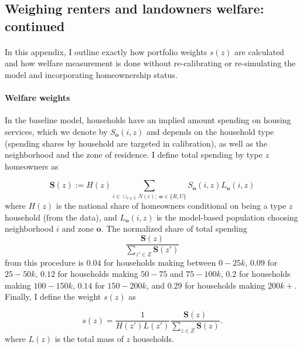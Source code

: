 \documentclass[12pt]{article}
\begin{document}
	
	\clearpage
	\subsection{Weighing renters and landowners welfare: continued}\label{Appendix:RenterLandownerWelfare}
	
	\paragraph*{}
	In this appendix, I outline exactly how portfolio weights $s(z)$ are calculated and how welfare measurement is done without re-calibrating or re-simulating the model and incorporating homeownership status. 
	
	\paragraph*{Welfare weights}
	In the baseline model, households have an implied amount spending on housing services, which we denote by $S_{\boldsymbol{o}}(i, z)$ and depends on the household type (spending shares by household are targeted in calibration), as well as the neighborhood and the zone of residence. I define total spending by type $z$ homeowners as 
	
	\begin{equation*}
		\boldsymbol{S}(z) := H(z)\sum_{i \in \cup_{c \in \mathbb{C}}N(c); \; \boldsymbol{o} \in \{R, U\}} S_{\boldsymbol{o}}(i, z)L_{\boldsymbol{o}}(i, z)
	\end{equation*}
	where $H(z)$ is the national share of homeowners conditional on being a type $z$ household (from the data), and $L_{\boldsymbol{o}}(i, z)$ is the model-based population choosing neighborhood $i$ and zone $\boldsymbol{o}$. The normalized share of total spending $$ \frac{\boldsymbol{S}(z)}{\sum_{z' \in Z}\boldsymbol{S}(z')} $$ from this procedure is $0.04$ for households making between $0-25k$, $0.09$ for $25-50k$, $0.12$ for households making $50-75$ and $75-100k$, $0.2$ for households making $100-150k$, $0.14$ for $150-200k$, and $0.29$ for households making $200k+$. Finally, I define the weight $s(z)$ as 
	
	\begin{equation*}
		s(z) = \frac{1}{H(z')L(z')}\frac{\boldsymbol{S}(z)}{\sum_{z \in Z}\boldsymbol{S}(z)}.
	\end{equation*}
	where $L(z)$ is the total mass of $z$ households.
	
	
	
\end{document}
